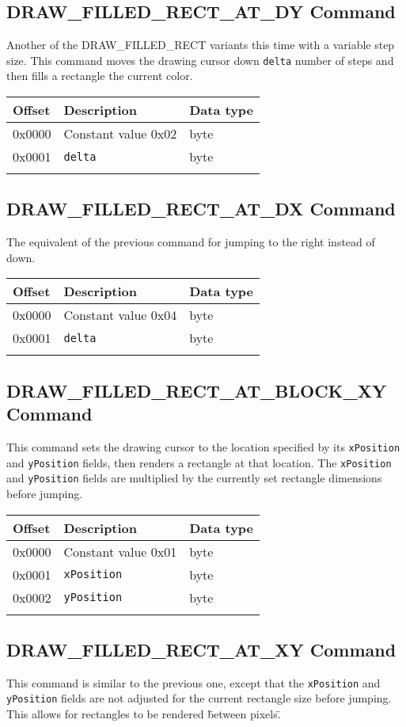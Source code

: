 \documentclass{article}
\newcommand{\field}[1]{\textcolor{fieldColor}{\texttt{#1}}}
\newenvironment{bytelisting}
{\ttfamily \begin{center} \begin{tabular}{l l l} Offset & Description & Data type \\ \hline}
{\normalfont \end{tabular} \end{center}}
\begin{document}
\subsection{DRAW\_FILLED\_RECT\_AT\_DY Command}
Another of the DRAW\_FILLED\_RECT variants this time with a variable step size. This command moves the drawing cursor down \field{delta} number of steps and then fills a rectangle the current color.

\begin{bytelisting}
0x0000 & Constant value 0x02 & byte \\
0x0001 & \field{delta} & byte \\
\end{bytelisting}

\subsection{DRAW\_FILLED\_RECT\_AT\_DX Command}
The equivalent of the previous command for jumping to the right instead of down.

\begin{bytelisting}
0x0000 & Constant value 0x04 & byte \\
0x0001 & \field{delta} & byte \\
\end{bytelisting}

\subsection{DRAW\_FILLED\_RECT\_AT\_BLOCK\_XY Command}
This command sets the drawing cursor to the location specified by its \field{xPosition} and \field{yPosition} fields, then renders a rectangle at that location.
The \field{xPosition} and \field{yPosition} fields are multiplied by the currently set rectangle dimensions before jumping.

\begin{bytelisting}
0x0000 & Constant value 0x01 & byte \\
0x0001 & \field{xPosition} & byte \\
0x0002 & \field{yPosition} & byte \\
\end{bytelisting}

\subsection{DRAW\_FILLED\_RECT\_AT\_XY Command}
This command is similar to the previous one, except that the \field{xPosition} and \field{yPosition} fields are not adjusted for the current rectangle size before jumping.
This allows for rectangles to be rendered \"between pixels\".
\end{document}
